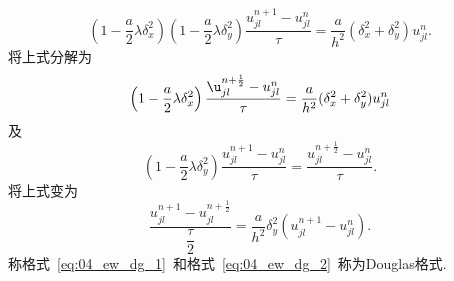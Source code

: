 \begin{equation}
\left(1-\dfrac{a}{2}\lambda\delta_x^2\right)\left(1-\dfrac{a}{2}\lambda\delta_y^2\right)
\dfrac{u_{jl}^{n+1}-u_{jl}^{n}}{\tau}=\dfrac{a}{h^2}(\delta_x^2+\delta_y^2)u_{jl}^n.
\end{equation}
将上式分解为
\begin{equation}\label{eq:04_ew_dg_1}
\left(1-\dfrac{a}{2}\lambda\delta_x^2\right)\dfrac{\u_{jl}^{n+\frac{1}{2}}-u_{jl}^n}{\tau}
=\dfrac{a}{h^2}(\delta_x^2+\delta_y^2)u_{jl}^n
\end{equation}
及
\begin{equation}
\left(1-\dfrac{a}{2}\lambda\delta_y^2\right)\dfrac{u_{jl}^{n+1}-u_{jl}^{n}}{\tau}=
\dfrac{u_{jl}^{n+\frac{1}{2}}-u_{jl}^n}{\tau}.
\end{equation}
将上式变为
\begin{equation}\label{eq:04_ew_dg_2}
\dfrac{u_{jl}^{n+1}-u_{jl}^{n+\frac{1}{2}}}{\dfrac{\tau}{2}}=\dfrac{a}{h^2}\delta_y^2(u_{jl}^{n+1}
-u_{jl}^n).
\end{equation}
称格式~\eqref{eq:04_ew_dg_1}~和格式~\eqref{eq:04_ew_dg_2}~称为Douglas格式.
